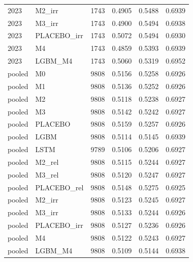 \begin{tabular}{llrrrr}
2023 & M2\_irr & 1743 & 0.4905 & 0.5488 & 0.6939 \\
2023 & M3\_irr & 1743 & 0.4900 & 0.5494 & 0.6938 \\
2023 & PLACEBO\_irr & 1743 & 0.5072 & 0.5494 & 0.6930 \\
2023 & M4 & 1743 & 0.4859 & 0.5393 & 0.6939 \\
2023 & LGBM\_M4 & 1743 & 0.5060 & 0.5319 & 0.6952 \\
pooled & M0 & 9808 & 0.5156 & 0.5258 & 0.6926 \\
pooled & M1 & 9808 & 0.5136 & 0.5252 & 0.6926 \\
pooled & M2 & 9808 & 0.5118 & 0.5238 & 0.6927 \\
pooled & M3 & 9808 & 0.5142 & 0.5242 & 0.6927 \\
pooled & PLACEBO & 9808 & 0.5159 & 0.5257 & 0.6926 \\
pooled & LGBM & 9808 & 0.5114 & 0.5145 & 0.6939 \\
pooled & LSTM & 9789 & 0.5106 & 0.5206 & 0.6927 \\
pooled & M2\_rel & 9808 & 0.5115 & 0.5244 & 0.6927 \\
pooled & M3\_rel & 9808 & 0.5120 & 0.5247 & 0.6927 \\
pooled & PLACEBO\_rel & 9808 & 0.5148 & 0.5275 & 0.6925 \\
pooled & M2\_irr & 9808 & 0.5123 & 0.5245 & 0.6927 \\
pooled & M3\_irr & 9808 & 0.5133 & 0.5244 & 0.6926 \\
pooled & PLACEBO\_irr & 9808 & 0.5127 & 0.5236 & 0.6926 \\
pooled & M4 & 9808 & 0.5122 & 0.5243 & 0.6927 \\
pooled & LGBM\_M4 & 9808 & 0.5109 & 0.5144 & 0.6938 \\
\bottomrule
\end{tabular}
